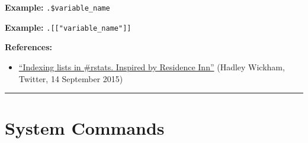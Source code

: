\documentclass[
]{book}
\newenvironment{Shaded}{\begin{snugshade}}{\end{snugshade}}
\newcommand{\KeywordTok}[1]{\textcolor[rgb]{0.13,0.29,0.53}{\textbf{#1}}}
\newcommand{\NormalTok}[1]{#1}
\newcommand{\OperatorTok}[1]{\textcolor[rgb]{0.81,0.36,0.00}{\textbf{#1}}}
\newcommand{\StringTok}[1]{\textcolor[rgb]{0.31,0.60,0.02}{#1}}
\providecommand{\tightlist}{%
  \setlength{\itemsep}{0pt}\setlength{\parskip}{0pt}}
\begin{document}
\textbf{Example:} \texttt{.\$variable\_name}

\begin{Shaded}
\end{Shaded}

\textbf{Example:} \texttt{.{[}{[}"variable\_name"{]}{]}}

\begin{Shaded}
\end{Shaded}

\textbf{References:}

\begin{itemize}
\tightlist
\item
  \href{https://twitter.com/hadleywickham/status/643381054758363136}{``Indexing lists in \#rstats. Inspired by Residence Inn''} (Hadley Wickham, Twitter, 14 September 2015)
\end{itemize}

\begin{center}\rule{0.5\linewidth}{0.5pt}\end{center}

\hypertarget{system-commands}{%
\section{System Commands}\label{system-commands}}
\end{document}
